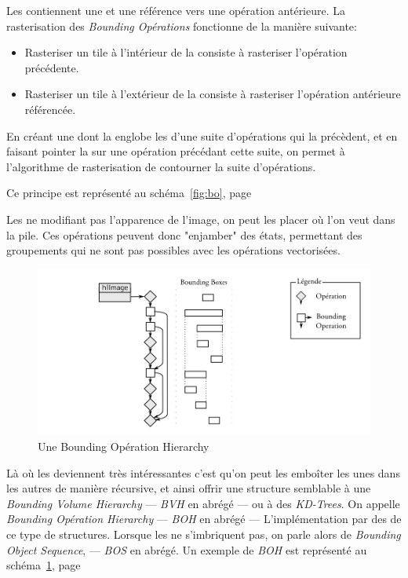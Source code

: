		Les \BO contiennent une \BB et une référence vers une opération antérieure.
		La rasterisation des \emph{Bounding Opérations} fonctionne de la manière suivante:
		\begin{itemize}
			\item Rasteriser un tile à l'intérieur de la \BB consiste à rasteriser l'opération précédente.
			\item Rasteriser un tile à l'extérieur de la \BB consiste à rasteriser l'opération antérieure référencée.
		\end{itemize}

		En créant une \BO dont la \BB englobe les \BB d'une suite
		d'opérations qui la précèdent, et en faisant pointer la \BO sur une opération précédant 
		cette suite, on permet à l'algorithme de rasterisation de contourner la suite d'opérations.
		
		Ce principe est représenté au schéma~\ref{fig:bo}, page~\pageref{fig:bo}

		Les \BO ne modifiant pas l'apparence de l'image, on peut les placer où l'on veut dans la pile. Ces 
		opérations peuvent donc "enjamber" des états, permettant des groupements qui ne sont pas possibles avec les opérations
		vectorisées.

		\begin{figure}[ht]
			\centering
			\includegraphics[width=\textwidth]{images/bo2} 
			\caption{Une Bounding Opération Hierarchy}
			\label{fig:bo2}
		\end{figure}

		Là où les \BO deviennent très intéressantes c'est qu'on peut les emboîter les unes dans les
		autres de manière récursive, et ainsi offrir une structure semblable à une \emph{Bounding Volume Hierarchy}\cite{shirley} 
		--- \emph{BVH} en abrégé --- ou à des \emph{KD-Trees}\cite{shirley}. On appelle \emph{Bounding Opération Hierarchy} --- \emph{BOH}
		en abrégé --- L'implémentation par des \BO de ce type de structures. Lorsque les \BO ne s'imbriquent pas, on parle alors de \emph{Bounding Object Sequence},
		--- \emph{BOS} en abrégé. Un exemple de \emph{BOH} est représenté au schéma~\ref{fig:bo2}, page~\pageref{fig:bo2} 

